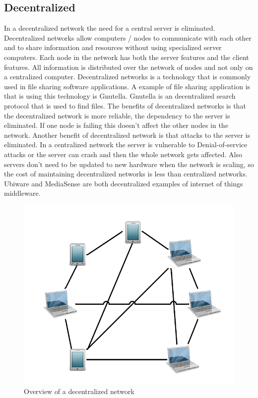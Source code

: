\subsection{Decentralized}
In a decentralized network the need for a central server is eliminated. Decentralized networks allow computers / nodes to communicate with each other and to share information and resources without using specialized server computers. Each node in the network has both the server features and the client features. All information is distributed over the network of nodes and not only on a centralized computer. Decentralized networks is a technology that is commonly used in file sharing software applications. A example of file sharing application is that is using this technology is Gnutella. Gnutella is an decentralized search protocol that is used to find files. The benefits of decentralized networks is that the decentralized network is more reliable, the dependency to the server is eliminated. If one node is failing this doesn't affect the other nodes in the network. Another benefit of decentralized network is that attacks to the server is eliminated. In a centralized network the server is vulnerable to Denial-of-service attacks or the server can crash and then the whole network gets affected. Also servers don't need to be updated to new hardware when the network is scaling, so the cost of maintaining decentralized networks is less than centralized networks. Ubiware \cite{osterle2010memorandum} and MediaSense \cite{TheMediaSenseFramework} are both decentralized examples of internet of things middleware. 

\begin{figure}[t]
	\centering
    	\includegraphics[scale=0.25]{part_2/sharing_the_information/Decentralized.png}
		\caption{Overview of a decentralized network} 
\end{figure}